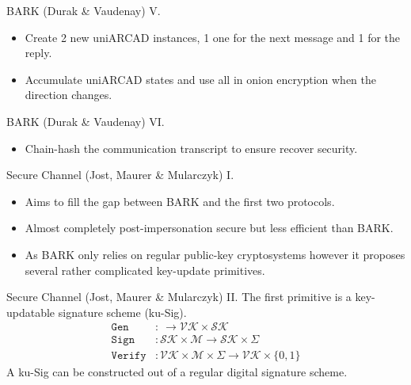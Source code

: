 \documentclass{beamer}
\begin{document}
\begin{frame}{BARK (Durak \& Vaudenay) V.}
  \scriptsize
  \begin{figure}[ht]
     \centering
     \setlength{\fboxsep}{10pt}
     \scalebox{0.5}{%
       \fbox{%
         
       }
     }
  \end{figure}
  \begin{itemize}
  \item Create 2 new uniARCAD instances, 1 one for the next message and 1
    for the reply.
  \item Accumulate uniARCAD states and use all in onion encryption when
    the direction changes.
  \end{itemize}
\end{frame}

\begin{frame}{BARK (Durak \& Vaudenay) VI.}
  \scriptsize
  \begin{figure}[ht]
     \centering
     \setlength{\fboxsep}{10pt}
     \scalebox{0.5}{%
       \fbox{%
         
       }
     }
  \end{figure}
  \begin{itemize}
  \item Chain-hash the communication transcript to ensure recover security.
  \end{itemize}
\end{frame}

\begin{frame}{Secure Channel (Jost, Maurer \& Mularczyk) I.}
  \begin{itemize}
  \item Aims to fill the gap between BARK and the first two protocols.
  \item Almost completely post-impersonation secure but less efficient than BARK.
  \item As BARK only relies on regular public-key cryptosystems however
    it proposes several rather complicated key-update primitives.
  \end{itemize}
\end{frame}

\begin{frame}{Secure Channel (Jost, Maurer \& Mularczyk) II.}
  The first primitive is a key-updatable signature scheme (ku-Sig).
  \begin{align*}
    \texttt{Gen} & : \ \rightarrow \mathcal{VK} \times \mathcal{SK} \\
    \texttt{Sign} & : \mathcal{SK} \times \mathcal{M} \rightarrow \mathcal{SK} \times \Sigma \\
    \texttt{Verify} & : \mathcal{VK} \times \mathcal{M} \times \Sigma
             \rightarrow \mathcal{VK} \times \{0,1\}
  \end{align*}
A ku-Sig can be constructed out of a regular digital signature scheme.
\end{frame}
\end{document}
